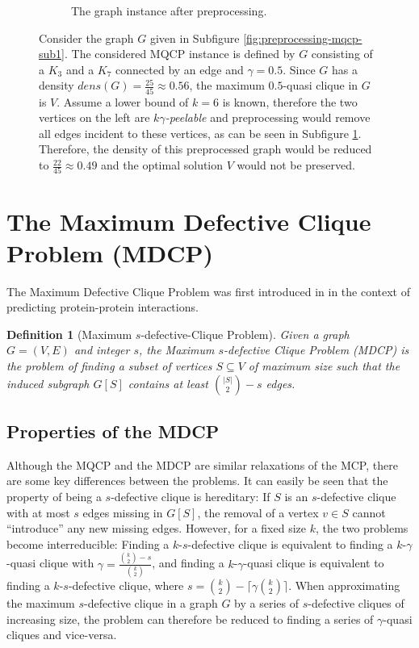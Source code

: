 \documentclass[draft,final]{vutinfth} %
\newtheorem{definition}{Definition}[section]
\begin{document}
\begin{figure}
\begin{subfigure}{.5\textwidth}
      \caption{The graph instance after preprocessing.}
      \label{fig:preprocessing-mqcp-sub2}
    \end{subfigure}
    \caption{Consider the graph $G$ given in Subfigure \ref{fig:preprocessing-mqcp-sub1}. The considered MQCP instance is defined by $G$ consisting of a $K_3$ and a $K_7$ connected by an edge and $\gamma=0.5$. Since $G$ has a density $dens(G) = \frac{25}{45} \approx 0.56$, the maximum $0.5$-quasi clique in $G$ is $V$. Assume a lower bound of $k=6$ is known, therefore the two vertices on the left are $k\gamma$\emph{-peelable} and preprocessing would remove all edges incident to these vertices, as can be seen in Subfigure \ref{fig:preprocessing-mqcp-sub2}. Therefore, the density of this preprocessed graph would be reduced to $\frac{22}{45} \approx 0.49$ and the optimal solution $V$ would not be preserved.}
    \label{fig:preprocessing-mqcp-counterexample}
\end{figure}

\section{The Maximum Defective Clique Problem (MDCP)}\label{sec:mdcp}

The Maximum Defective Clique Problem was first introduced in \cite{Yu2006} in the context of predicting protein-protein interactions. 

\begin{definition}[Maximum $s$-defective-Clique Problem]
	\label{def:mdcp}
	Given a graph \\ 
    $G = (V,E)$ and integer $s$, the Maximum $s$-defective Clique Problem (MDCP) is the problem of finding a subset of vertices $S \subseteq V$ of maximum size 
	such that the induced subgraph $G[S]$ contains at least $\binom{|S|}{2} - s$ edges. 
\end{definition}

\subsection{Properties of the MDCP}

Although the MQCP and the MDCP are similar relaxations of the MCP, there are some key differences between the problems. It can easily be seen that the property of being a $s$-defective clique is hereditary: If $S$ is an $s$-defective clique with at most $s$ edges missing in $G[S]$, the removal of a vertex $v \in S$ cannot ``introduce'' any new missing edges.  
However, for a fixed size $k$, the two problems become interreducible: 
Finding a $k$-$s$-defective clique is equivalent to finding a $k$-$\gamma$-quasi clique with $\gamma = \frac{\binom{k}{2} - s}{\binom{k}{2}} $, and finding a $k$-$\gamma$-quasi clique is equivalent to finding a $k$-$s$-defective clique, where $s = \binom{k}{2} - \lceil \gamma \binom{k}{2} \rceil$. 
When approximating the maximum $s$-defective clique in a graph $G$ by a series of $s$-defective cliques of increasing size, the problem can therefore be reduced to finding a series of $\gamma$-quasi cliques and vice-versa.
\end{document}
